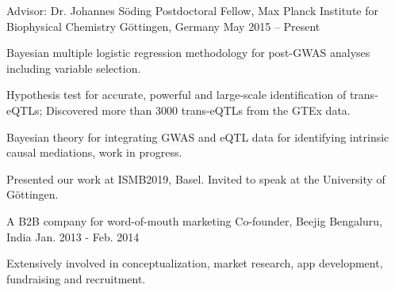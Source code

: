 


\begin{cventries}


\cventry
{Advisor: Dr. Johannes S{\"o}ding} %
{Postdoctoral Fellow, Max Planck Institute for Biophysical Chemistry} %
{G{\"o}ttingen, Germany} %
{May 2015 -- Present} %
{ %
\begin{cvitems}
\item {Bayesian multiple logistic regression methodology for post-GWAS analyses including variable selection.}
\item {Hypothesis test for accurate, powerful and large-scale identification of trans-eQTLs; Discovered more than 3000 trans-eQTLs from the GTEx data.}
\item {Bayesian theory for integrating GWAS and eQTL data for identifying intrinsic causal mediations, work in progress.}
\item {Presented our work at ISMB2019, Basel. Invited to speak at the University of G{\"o}ttingen.}
\end{cvitems}
}


\cventry
{A B2B company for word-of-mouth marketing} %
{Co-founder, Beejig} %
{Bengaluru, India} %
{Jan. 2013 - Feb. 2014} %
{ %
\begin{cvitems}
\item {Extensively involved in conceptualization, market research, app development, fundraising and recruitment.}
\end{cvitems}
}


\end{cventries}
